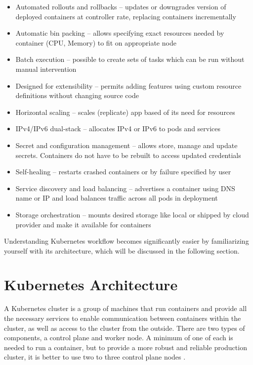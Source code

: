 \begin{itemize}
    \item Automated rollouts and rollbacks -- updates or downgrades version of deployed containers at controller rate, replacing containers incrementally
    \item Automatic bin packing --  allows specifying exact resources needed by container (CPU, Memory) to fit on appropriate node
    \item Batch execution -- possible to create sets of tasks which can be run without manual intervention
    \item Designed for extensibility -- permits adding features using custom resource definitions without changing source code
    \item Horizontal scaling -- scales (replicate) app based of its need for resources
    \item IPv4/IPv6 dual-stack -- allocates IPv4 or IPv6 to pods and services
    \item Secret and configuration management -- allows store, manage and update secrets. Containers do not have to be rebuilt to access updated  credentials
    \item Self-healing -- restarts crashed containers or by failure specified by user
    \item Service discovery and load balancing -- advertises a container using DNS name or IP and load balances traffic across all pods in deployment
    \item Storage orchestration -- mounts desired storage like local or shipped by cloud provider and make it available for containers
\end{itemize}
Understanding Kubernetes workflow becomes significantly easier by familiarizing yourself with its architecture, which will be discussed in the following section.



\section{Kubernetes Architecture}
\label{sec:k8s_arch}
A Kubernetes cluster is a group of machines that run containers and provide all the necessary services to enable communication between containers within the cluster, as well as access to the cluster from the outside. There are two types of components, a control plane and worker node. A minimum of one of each is needed to run a container, but to provide a more robust and reliable production cluster, it is better to use two to three control plane nodes  \cite{KubernetesArch}. 

